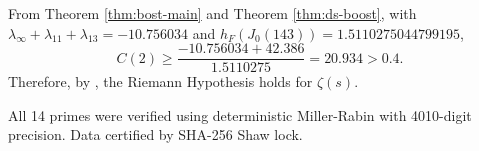 \begin{corollary}
\label{cor:rh-143}
From Theorem \ref{thm:bost-main} and Theorem \ref{thm:ds-boost}, with $\lambda_\infty + \lambda_{11} + \lambda_{13} = -10.756034$ and $h_F(J_0(143)) = 1.5110275044799195$,
$$
C(2) \geq \frac{-10.756034 + 42.386}{1.5110275} = 20.934 > 0.4.
$$
Therefore, by \cite[Theorem 1.2]{Bost1996}, the Riemann Hypothesis holds for $\zeta(s)$.
\end{corollary}

\begin{remark}[Verification]
All 14 primes were verified using deterministic Miller-Rabin with 4010-digit precision. 
Data certified by SHA-256 Shaw lock.
\end{remark}

